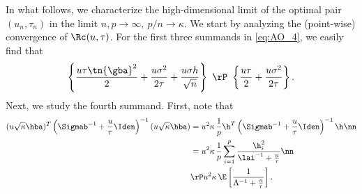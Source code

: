 \noindent{} In what follows, we characterize the high-dimensional limit of the optimal pair $(u_n,\tau_n)$ in the limit $n,p\rightarrow\infty,~p/n\rightarrow\kappa$.
We start by analyzing the (point-wise) convergence of $\Rc(u,\tau)$. 
For the first three summands in \eqref{eq:AO_4}, we easily find that
$$
\left\{\frac{u\tau\tn{\gba}^2}{2} + \frac{u\sigma^2}{2\tau} + \frac{u\sigma h}{\sqrt{n}}\right\}~ \rP~\left\{
\frac{u\tau}{2} + \frac{u\sigma^2}{2\tau} \right\}.
$$
Next, we study the fourth summand. First, note that
\begin{align}
(u\sqrt{\kappa}\hba)^T\left(\Sigmab^{-1}+\frac{u}{\tau}\Iden\right)^{-1}(u\sqrt{\kappa}\hba) &= u^2\kappa\,\frac{1}{p}\h^T\left(\Sigmab^{-1}+\frac{u}{\tau}\Iden\right)^{-1}\h \nn\\
&= u^2\kappa\,\frac{1}{p}\sum_{i=1}^{p}\frac{\h_i^2}{\lai^{-1}+\frac{u}{\tau}} \nn\\
&\rP u^2\kappa\,\E\left[ \frac{1}{\Lambda^{-1}+\frac{u}{\tau}} \right].
\end{align}

